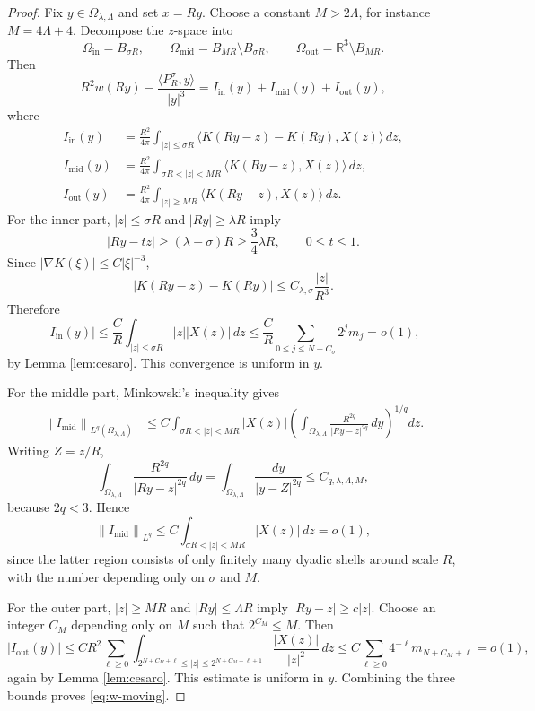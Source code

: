 \documentclass[11pt]{amsart}
\numberwithin{equation}{section}
\theoremstyle{definition}
\newcommand{\R}{\mathbb R}
\newcommand{\ip}[2]{\langle #1,#2\rangle}
\newcommand{\norm}[1]{\left\lVert #1\right\rVert}
\newcommand{\abs}[1]{\left\lvert #1\right\rvert}
\begin{document}
\begin{proof}
Fix $y\in\Omega_{\lambda,\Lambda}$ and set $x=Ry$.  Choose a constant $M>2\Lambda$, for instance $M=4\Lambda+4$.  Decompose the $z$-space into
$$
        \Omega_{\mathrm{in}}=B_{\sigma R},\qquad
        \Omega_{\mathrm{mid}}=B_{MR}\setminus B_{\sigma R},\qquad
        \Omega_{\mathrm{out}}=\R^3\setminus B_{MR}.
$$
Then
$$
        R^2w(Ry)-\frac{\ip{P_R^\sigma}{y}}{\abs y^3}
        =I_{\mathrm{in}}(y)+I_{\mathrm{mid}}(y)+I_{\mathrm{out}}(y),
$$
where
$$
\begin{aligned}
        I_{\mathrm{in}}(y)
        &=\frac{R^2}{4\pi}\int_{\abs z\le \sigma R}
        \ip{K(Ry-z)-K(Ry)}{X(z)}\,dz,                                      \\
        I_{\mathrm{mid}}(y)
        &=\frac{R^2}{4\pi}\int_{\sigma R<\abs z<MR}
        \ip{K(Ry-z)}{X(z)}\,dz,                                             \\
        I_{\mathrm{out}}(y)
        &=\frac{R^2}{4\pi}\int_{\abs z\ge MR}
        \ip{K(Ry-z)}{X(z)}\,dz.
\end{aligned}
$$
For the inner part, $\abs z\le \sigma R$ and $\abs{Ry}\ge\lambda R$ imply
$$
        \abs{Ry-tz}\ge(\lambda-\sigma)R\ge \frac34\lambda R,
        \qquad 0\le t\le1.
$$
Since $\abs{\nabla K(\xi)}\le C\abs{\xi}^{-3}$,
$$
        \abs{K(Ry-z)-K(Ry)}\le C_{\lambda,\sigma}\frac{\abs z}{R^3}.
$$
Therefore
$$
        \abs{I_{\mathrm{in}}(y)}
        \le \frac{C}{R}\int_{\abs z\le \sigma R}\abs z\abs{X(z)}\,dz
        \le \frac{C}{R}\sum_{0\le j\le N+C_\sigma}2^j m_j=o(1),
$$
by Lemma \ref{lem:cesaro}.  This convergence is uniform in $y$.

For the middle part, Minkowski's inequality gives
$$
\begin{aligned}
        \norm{I_{\mathrm{mid}}}_{L^q(\Omega_{\lambda,\Lambda})}
        &\le C\int_{\sigma R<\abs z<MR}\abs{X(z)}
        \left(\int_{\Omega_{\lambda,\Lambda}}
        \frac{R^{2q}}{\abs{Ry-z}^{2q}}\,dy\right)^{1/q}dz.
\end{aligned}
$$
Writing $Z=z/R$,
$$
        \int_{\Omega_{\lambda,\Lambda}}
        \frac{R^{2q}}{\abs{Ry-z}^{2q}}\,dy
        =\int_{\Omega_{\lambda,\Lambda}}\frac{dy}{\abs{y-Z}^{2q}}
        \le C_{q,\lambda,\Lambda,M},
$$
because $2q<3$.  Hence
$$
        \norm{I_{\mathrm{mid}}}_{L^q}
        \le C\int_{\sigma R<\abs z<MR}\abs{X(z)}\,dz=o(1),
$$
since the latter region consists of only finitely many dyadic shells around scale $R$, with the number depending only on $\sigma$ and $M$.

For the outer part, $\abs z\ge MR$ and $\abs{Ry}\le\Lambda R$ imply $\abs{Ry-z}\ge c\abs z$.  Choose an integer $C_M$ depending only on $M$ such that $2^{C_M}\le M$.  Then
$$
        \abs{I_{\mathrm{out}}(y)}
        \le C R^2\sum_{\ell\ge0}
        \int_{2^{N+C_M+\ell}\le\abs z\le2^{N+C_M+\ell+1}}
        \frac{\abs{X(z)}}{\abs z^2}\,dz
        \le C\sum_{\ell\ge0}4^{-\ell}m_{N+C_M+\ell}=o(1),
$$
again by Lemma \ref{lem:cesaro}.  This estimate is uniform in $y$.  Combining the three bounds proves \eqref{eq:w-moving}.
\end{proof}
\end{document}
